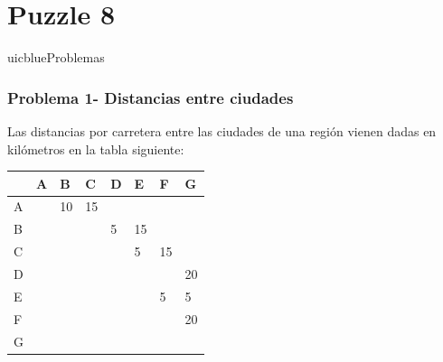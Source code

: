 \documentclass[xcolor=table]{beamer}
\begin{document}
\section{Puzzle 8}
\begin{chapter}{uicblue}{Problemas}
\end{chapter}




\begin{frame} \frametitle{Problema 1- Distancias entre ciudades} \tiny

Las distancias por carretera entre las ciudades de una región vienen dadas en kilómetros en la tabla siguiente:


\begin{table}[]
\begin{tabular}{|l|l|l|l|l|l|l|l|}
\hline
  & A                                               & B                        & C                        & D                        & E                        & F                        & G                        \\ \hline
A & \cellcolor[HTML]{C0C0C0}{\color[HTML]{9B9B9B} } & 10                       & 15                       &                          &                          &                          &                          \\ \hline
B & \cellcolor[HTML]{C0C0C0}                        & \cellcolor[HTML]{C0C0C0} &                          & 5                        & 15                       &                          &                          \\ \hline
C & \cellcolor[HTML]{C0C0C0}                        & \cellcolor[HTML]{C0C0C0} & \cellcolor[HTML]{C0C0C0} &                          & 5                        & 15                       &                          \\ \hline
D & \cellcolor[HTML]{C0C0C0}                        & \cellcolor[HTML]{C0C0C0} & \cellcolor[HTML]{C0C0C0} & \cellcolor[HTML]{C0C0C0} &                          &                          & 20                       \\ \hline
E & \cellcolor[HTML]{C0C0C0}                        & \cellcolor[HTML]{C0C0C0} & \cellcolor[HTML]{C0C0C0} & \cellcolor[HTML]{C0C0C0} & \cellcolor[HTML]{C0C0C0} & 5                        & 5                        \\ \hline
F & \cellcolor[HTML]{C0C0C0}                        & \cellcolor[HTML]{C0C0C0} & \cellcolor[HTML]{C0C0C0} & \cellcolor[HTML]{C0C0C0} & \cellcolor[HTML]{C0C0C0} & \cellcolor[HTML]{C0C0C0} & 20                       \\ \hline
G & \cellcolor[HTML]{C0C0C0}                        & \cellcolor[HTML]{C0C0C0} & \cellcolor[HTML]{C0C0C0} & \cellcolor[HTML]{C0C0C0} & \cellcolor[HTML]{C0C0C0} & \cellcolor[HTML]{C0C0C0} & \cellcolor[HTML]{C0C0C0} \\ \hline
\end{tabular}
\end{table}



\end{frame}
\end{document}
